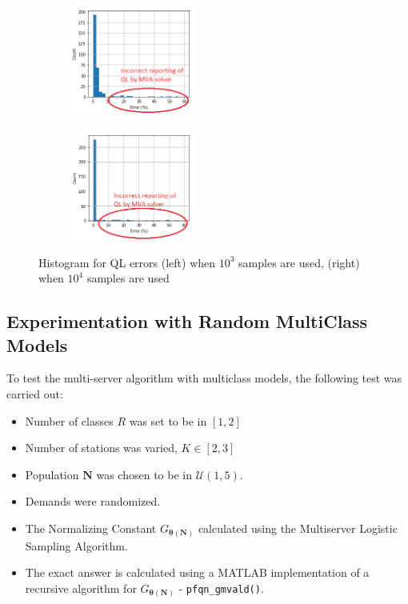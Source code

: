 \begin{figure}[!htb]
\begin{center}
\begin{subfigure}
    \centering
    \includegraphics[width=0.45\textwidth]{Chap6_EvaluationAndAnalysis/multiserver/histogram_QL_1000samples.png}
\end{subfigure}
\begin{subfigure}
    \centering
    \includegraphics[width=0.45\textwidth]{Chap6_EvaluationAndAnalysis/multiserver/histogram_QL_10000samples.png}
\end{subfigure}
\caption{ Histogram for QL errors (left) when \(10^3\) samples are used, (right) when \(10^4\) samples are used}
\label{fig:Histogram_multiserver}
\end{center}
\end{figure}

\subsection{Experimentation with Random MultiClass Models}
To test the multi-server algorithm with multiclass models, the following test was carried out:
\begin{itemize}[noitemsep]
    \item Number of classes \(R\) was set to be in \([1,2]\)
    \item Number of stations was varied, \(K \in [2,3]\)
    \item Population \(\mathbf{N}\) was chosen to be in \(\mathcal{U}(1,5)\).
    \item Demands were randomized.
    \item The Normalizing Constant \(G_{\boldsymbol{\theta}(\mathbf{N})}\) calculated using the Multiserver Logistic Sampling Algorithm.
    \item The exact answer is calculated using a MATLAB implementation of a recursive algorithm for \(G_{\boldsymbol{\theta}(\mathbf{N})}\) - \texttt{pfqn\_gmvald()}.
\end{itemize}

